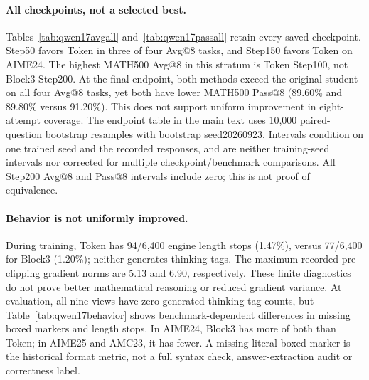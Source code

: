 \paragraph{All checkpoints, not a selected best.}
Tables~\ref{tab:qwen17avgall} and~\ref{tab:qwen17passall} retain every saved checkpoint.
Step50 favors Token in three of four Avg@8 tasks, and Step150 favors Token on
AIME24. The highest MATH500 Avg@8 in this stratum is Token Step100, not Block3
Step200. At the final endpoint, both methods exceed the original student on all
four Avg@8 tasks, yet both have lower MATH500 Pass@8 (89.60\% and 89.80\% versus
91.20\%). This does not support uniform improvement in eight-attempt coverage.
The endpoint table in the main text uses 10,000 paired-question bootstrap resamples
with bootstrap seed20260923. Intervals condition on one trained seed and the
recorded responses, and are neither training-seed intervals nor corrected for
multiple checkpoint/benchmark comparisons. All Step200 Avg@8 and Pass@8 intervals
include zero; this is not proof of equivalence.

\begin{table}[htbp]
\centering\small
\caption{Official 8B to 1.7B Instruct: complete Avg@8 (\%), including the original student. Each benchmark is scored separately.}
\label{tab:qwen17avgall}

\end{table}
\begin{table}[htbp]
\centering\small
\caption{The same model views evaluated with Pass@8 (\%). Eight attempts per question are not eight independent training runs.}
\label{tab:qwen17passall}

\end{table}
\FloatBarrier

\paragraph{Behavior is not uniformly improved.}
During training, Token has 94/6,400 engine length stops (1.47\%), versus 77/6,400
for Block3 (1.20\%); neither generates thinking tags. The maximum recorded
pre-clipping gradient norms are 5.13 and 6.90, respectively. These finite
diagnostics do not prove better mathematical reasoning or reduced gradient variance.
At evaluation, all nine views have zero generated thinking-tag counts, but
Table~\ref{tab:qwen17behavior} shows benchmark-dependent differences in missing
boxed markers and length stops. In AIME24, Block3 has more of both than Token;
in AIME25 and AMC23, it has fewer. A missing literal boxed marker is the historical
format metric, not a full syntax check, answer-extraction audit or correctness label.

